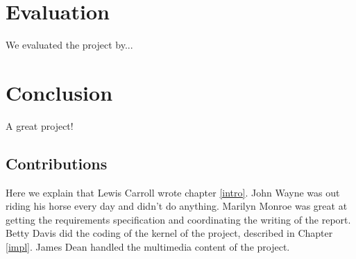 \documentclass{l3proj}
\begin{document}
\chapter{Evaluation}

We evaluated the project by...

\chapter{Conclusion}

A great project!

\section{Contributions}

Here we explain that Lewis Carroll wrote chapter \ref{intro}. John Wayne
was out riding his horse every day and didn't do anything. Marilyn Monroe
was great at getting the requirements specification and coordinating the
writing of the report. Betty Davis did the coding of the kernel of the
project, described in Chapter \ref{impl}.  James Dean handled the
multimedia content of the project.



\end{document}
